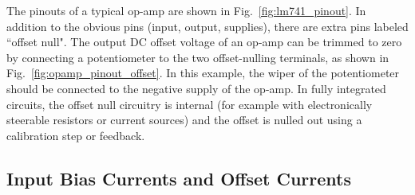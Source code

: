The pinouts of a typical op-amp are shown in Fig.~\ref{fig:lm741_pinout}.  In addition to the obvious pins (input, output, supplies), there are extra pins labeled ``offset null".   The output DC offset voltage of an op-amp can be trimmed to zero by connecting a potentiometer to the two offset-nulling terminals, as shown in Fig.~\ref{fig:opamp_pinout_offset}. In this example, the wiper of the potentiometer should be connected to the negative supply of the op-amp.  In fully integrated circuits, the offset null circuitry is internal (for example with electronically steerable resistors or current sources) and the offset is nulled out using a calibration step or feedback.  
 

\subsection{Input Bias Currents and Offset Currents}



